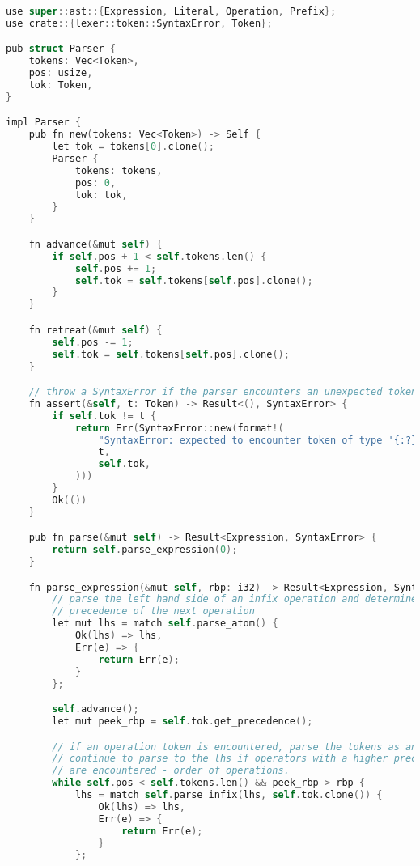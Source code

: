 \begin{lstlisting}[language=C]
use super::ast::{Expression, Literal, Operation, Prefix};
use crate::{lexer::token::SyntaxError, Token};

pub struct Parser {
    tokens: Vec<Token>,
    pos: usize,
    tok: Token,
}

impl Parser {
    pub fn new(tokens: Vec<Token>) -> Self {
        let tok = tokens[0].clone();
        Parser {
            tokens: tokens,
            pos: 0,
            tok: tok,
        }
    }

    fn advance(&mut self) {
        if self.pos + 1 < self.tokens.len() {
            self.pos += 1;
            self.tok = self.tokens[self.pos].clone();
        }
    }

    fn retreat(&mut self) {
        self.pos -= 1;
        self.tok = self.tokens[self.pos].clone();
    }

    // throw a SyntaxError if the parser encounters an unexpected token (!= t)
    fn assert(&self, t: Token) -> Result<(), SyntaxError> {
        if self.tok != t {
            return Err(SyntaxError::new(format!(
                "SyntaxError: expected to encounter token of type '{:?}', instead encountered '{:?}'",
                t,
                self.tok,
            )))
        }
        Ok(())
    }

    pub fn parse(&mut self) -> Result<Expression, SyntaxError> {
        return self.parse_expression(0);
    }

    fn parse_expression(&mut self, rbp: i32) -> Result<Expression, SyntaxError> {
        // parse the left hand side of an infix operation and determine the 
        // precedence of the next operation
        let mut lhs = match self.parse_atom() {
            Ok(lhs) => lhs,
            Err(e) => {
                return Err(e);
            }
        };

        self.advance();
        let mut peek_rbp = self.tok.get_precedence();

        // if an operation token is encountered, parse the tokens as an infix expression, and 
        // continue to parse to the lhs if operators with a higher precedence than rbp (e.g. *, /)
        // are encountered - order of operations.
        while self.pos < self.tokens.len() && peek_rbp > rbp {
            lhs = match self.parse_infix(lhs, self.tok.clone()) {
                Ok(lhs) => lhs,
                Err(e) => {
                    return Err(e);
                }
            };


\end{lstlisting}
